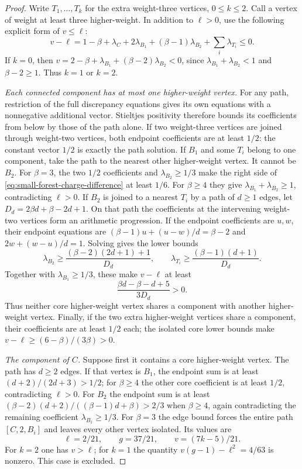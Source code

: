 \documentclass[11pt,reqno]{amsart}
\theoremstyle{definition}
\theoremstyle{remark}
\numberwithin{equation}{section}
\begin{document}
\begin{proof}
Write $T_1,\ldots,T_k$ for the extra weight-three vertices, $0\le k\le2$.
Call a vertex of weight at least three higher-weight. In addition to $\ell>0$,
use the following explicit form of $v\le\ell$:
\begin{equation}\label{eq:small-forest-charge-difference}
  v-\ell=1-\beta+\lambda_C+2\lambda_{B_1}
             +(\beta-1)\lambda_{B_2}+\sum_i\lambda_{T_i}\le0.
\end{equation}
If $k=0$, then
$v=2-\beta+\lambda_{B_1}+(\beta-2)\lambda_{B_2}<0$, since
$\lambda_{B_1}+\lambda_{B_2}<1$ and $\beta-2\ge1$. Thus $k=1$ or $k=2$.

\emph{Each connected component has at most one higher-weight vertex.}
For any path, restriction of the full discrepancy equations gives its
own equations with a nonnegative additional vector. Stieltjes positivity
therefore bounds its coefficients from below by those of the path alone.
If two weight-three vertices are joined through weight-two vertices, both
endpoint coefficients are at least $1/2$: the constant vector $1/2$ is
exactly the path solution. If $B_1$ and some $T_i$ belong to one component,
take the path to the nearest other higher-weight vertex. It cannot be $B_2$.
For $\beta=3$, the two $1/2$ coefficients and
$\lambda_{B_2}\ge1/3$ make the right side of
\eqref{eq:small-forest-charge-difference} at least $1/6$.
For $\beta\ge4$ they give
$\lambda_{B_1}+\lambda_{B_2}\ge1$, contradicting $\ell>0$.
If $B_2$ is joined to a nearest $T_i$ by a path of $d\ge1$ edges, let
$D_d=2\beta d+\beta-2d+1$. On that path the coefficients at the intervening weight-two
vertices form an arithmetic progression. If the endpoint coefficients
are $u,w$, their endpoint equations are
$(\beta-1)u+(u-w)/d=\beta-2$ and
$2w+(w-u)/d=1$. Solving gives the lower bounds
\[
 \lambda_{B_2}\ge\frac{(\beta-2)(2d+1)+1}{D_d},\qquad
 \lambda_{T_i}\ge\frac{(\beta-1)(d+1)}{D_d}.
\]
Together with $\lambda_{B_1}\ge1/3$, these make $v-\ell$ at least
\[
 \frac{\beta d-\beta-d+5}{3D_d}>0.
\]
Thus neither core higher-weight vertex shares a component with another higher-weight
vertex. Finally, if the two extra higher-weight vertices share a component,
their coefficients are at least $1/2$ each; the isolated core lower
bounds make $v-\ell\ge(6-\beta)/(3\beta)>0$.

\emph{The component of $C$.}
Suppose first it contains a core higher-weight vertex. The path has $d\ge2$
edges. If that vertex is $B_1$, the endpoint sum is at least
$(d+2)/(2d+3)>1/2$; for $\beta\ge4$ the other core coefficient is at
least $1/2$, contradicting $\ell>0$.
For $B_2$ the endpoint sum is at least
$(\beta-2)(d+2)/((\beta-1)d+\beta)>2/3$ when $\beta\ge4$, again
contradicting the remaining coefficient $\lambda_{B_1}\ge1/3$.
For $\beta=3$ the edge bound forces the entire path $[C,2,B_i]$ and
leaves every other vertex isolated. Its values are
\[
 \ell=2/21,\qquad g=37/21,\qquad v=(7k-5)/21.
\]
For $k=2$ one has $v>\ell$; for $k=1$ the quantity
$v(g-1)-\ell^2=4/63$ is nonzero. This case is excluded.


\end{proof}
\end{document}
